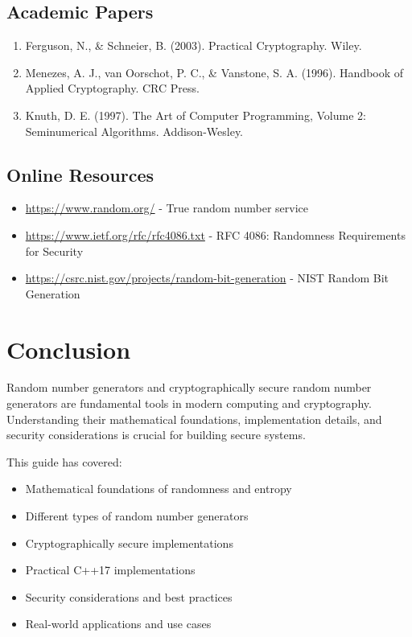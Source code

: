 \documentclass[11pt,a4paper]{article}
\begin{document}
\subsection{Academic Papers}

\begin{enumerate}
    \item Ferguson, N., \& Schneier, B. (2003). Practical Cryptography. Wiley.
    \item Menezes, A. J., van Oorschot, P. C., \& Vanstone, S. A. (1996). Handbook of Applied Cryptography. CRC Press.
    \item Knuth, D. E. (1997). The Art of Computer Programming, Volume 2: Seminumerical Algorithms. Addison-Wesley.
\end{enumerate}

\subsection{Online Resources}

\begin{itemize}
    \item \url{https://www.random.org/} - True random number service
    \item \url{https://www.ietf.org/rfc/rfc4086.txt} - RFC 4086: Randomness Requirements for Security
    \item \url{https://csrc.nist.gov/projects/random-bit-generation} - NIST Random Bit Generation
\end{itemize}

\section{Conclusion}

Random number generators and cryptographically secure random number generators are fundamental tools in modern computing and cryptography. Understanding their mathematical foundations, implementation details, and security considerations is crucial for building secure systems.

This guide has covered:
\begin{itemize}
    \item Mathematical foundations of randomness and entropy
    \item Different types of random number generators
    \item Cryptographically secure implementations
    \item Practical C++17 implementations
    \item Security considerations and best practices
    \item Real-world applications and use cases
\end{itemize}
\end{document}
